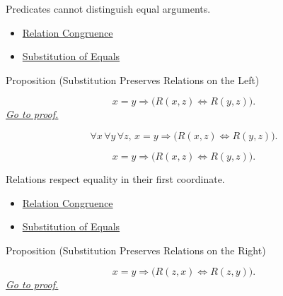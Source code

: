 \begin{remark*}[Interpretation]
Predicates cannot distinguish equal arguments.
\end{remark*}

\begin{dependencies}
\begin{itemize}
  \item \hyperref[thm:axiomatic-equality-relation-congruence]{Relation Congruence}
  \item \hyperref[ax:equality-substitution]{Substitution of Equals}
\end{itemize}
\end{dependencies}

\begin{propositionbox}{Proposition (Substitution Preserves Relations on the Left)}
\begin{proposition}
\label{prop:substitution-preserves-relations-left}
\[
x=y \Longrightarrow \bigl(R(x,z)\Longleftrightarrow R(y,z)\bigr).
\]
\hyperref[prf:substitution-preserves-relations-left]{\textit{Go to proof.}}
\end{proposition}
\end{propositionbox}

\begin{remark*}
\[
\forall x\,\forall y\,\forall z,\,
x=y \Longrightarrow
\bigl(R(x,z)\Longleftrightarrow R(y,z)\bigr).
\]
\end{remark*}

\begin{remark*}
\[
x=y \Longrightarrow \bigl(R(x,z)\Longleftrightarrow R(y,z)\bigr).
\]
\end{remark*}

\begin{remark*}[Interpretation]
Relations respect equality in their first coordinate.
\end{remark*}

\begin{dependencies}
\begin{itemize}
  \item \hyperref[thm:axiomatic-equality-relation-congruence]{Relation Congruence}
  \item \hyperref[ax:equality-substitution]{Substitution of Equals}
\end{itemize}
\end{dependencies}

\begin{propositionbox}{Proposition (Substitution Preserves Relations on the Right)}
\begin{proposition}
\label{prop:substitution-preserves-relations-right}
\[
x=y \Longrightarrow \bigl(R(z,x)\Longleftrightarrow R(z,y)\bigr).
\]
\hyperref[prf:substitution-preserves-relations-right]{\textit{Go to proof.}}
\end{proposition}
\end{propositionbox}

